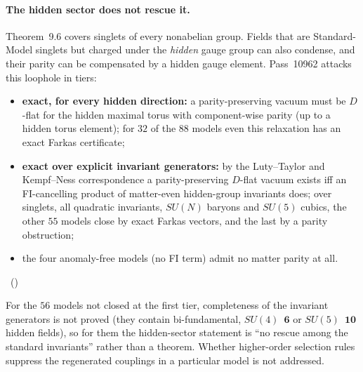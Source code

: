 \paragraph{The hidden sector does not rescue it.}
Theorem~9.6 covers singlets of every nonabelian group. Fields that are Standard-Model
singlets but charged under the \emph{hidden} gauge group can also condense, and their parity
can be compensated by a hidden gauge element. Pass~10962 attacks this loophole in tiers:
\begin{itemize}[leftmargin=1.2em]
\item \textbf{exact, for every hidden direction:} a parity-preserving vacuum must be $D$-flat for
      the hidden maximal torus with component-wise parity (up to a hidden torus element);
      for $32$ of the $88$ models even this relaxation has an exact Farkas certificate;
\item \textbf{exact over explicit invariant generators:} by the Luty--Taylor and Kempf--Ness
      correspondence a parity-preserving $D$-flat vacuum exists iff an FI-cancelling product of
      matter-even hidden-group invariants does; over singlets, all quadratic invariants,
      $SU(N)$ baryons and $SU(5)$ cubics, the other $55$ models close by exact Farkas vectors,
      and the last by a parity obstruction;
\item the four anomaly-free models (no FI term) admit no matter parity at all.
\end{itemize}
\tierC\ ()

\begin{boundary}[Scope]
For the $56$ models not closed at the first tier, completeness of the invariant generators is
not proved (they contain bi-fundamental, $SU(4)$~$\mathbf6$ or $SU(5)$~$\mathbf{10}$ hidden
fields), so for them the hidden-sector statement is ``no rescue among the standard
invariants'' rather than a theorem. Whether higher-order selection rules suppress the
regenerated couplings in a particular model is not addressed. \tierO
\end{boundary}

